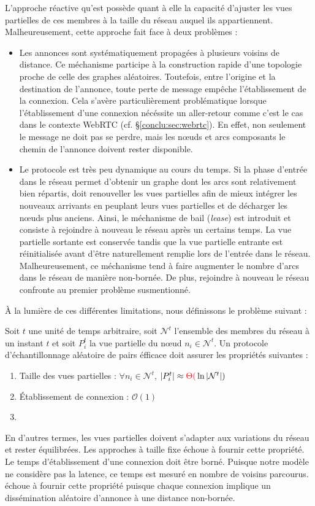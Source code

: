 L'approche réactive qu'est \SCAMP possède quant à elle la capacité d'ajuster les
vues partielles de ces membres à la taille du réseau auquel ils
appartiennent. Malheureusement, cette approche fait face à deux problèmes :
\begin{itemize}
\item Les annonces sont systématiquement propagées à plusieurs voisins de
  distance. Ce méchanisme participe à la construction rapide d'une topologie
  proche de celle des graphes aléatoires. Toutefois, entre l'origine et la
  destination de l'annonce, toute perte de message empêche l'établissement de la
  connexion. Cela s'avère particulièrement problématique lorsque l'établissement
  d'une connexion nécéssite un aller-retour comme c'est le cas dans le contexte
  WebRTC (cf. §\ref{conclu:sec:webrtc}). En effet, non seulement le message ne
  doit pas se perdre, mais les nœuds et arcs composants le chemin de l'annonce
  doivent rester disponible.
\item Le protocole est très peu dynamique au cours du temps. Si la phase
  d'entrée dans le réseau permet d'obtenir un graphe dont les arcs sont
  relativement bien répartis, \SCAMP doit renouveller les vues partielles afin
  de mieux intégrer les nouveaux arrivants en peuplant leurs vues partielles et
  de décharger les nœuds plus anciens. Ainsi, le méchanisme de bail
  (\emph{lease}) est introduit et consiste à rejoindre à nouveau le réseau après
  un certains temps. La vue partielle sortante est conservée tandis que la vue
  partielle entrante est réinitialisée avant d'être naturellement remplie lors
  de l'entrée dans le réseau. Malheureusement, ce méchanisme tend à faire
  augmenter le nombre d'arcs dans le réseau de manière non-bornée. De plus,
  rejoindre à nouveau le réseau confronte au premier problème susmentionné.
\end{itemize}
À la lumière de ces différentes limitations, nous définissons le problème
suivant :

\begin{problem}
  Soit $t$ une unité de temps arbitraire, soit $\mathcal{N}^t$ l'ensemble des
  membres du réseau à un instant $t$ et soit $P_i^t$ la vue partielle du nœud
  $n_i \in \mathcal{N}^t$. Un protocole d'échantillonnage aléatoire de pairs
  éfficace doit assurer les propriétés suivantes :
  \begin{enumerate}
  \item Taille des vues partielles : \hfill $\forall n_i \in \mathcal{N}^t$,
    $|P_i^t| \approx \textcolor{red}{\Theta(} \ln |\mathcal{N}^t|)$
  \item Établissement de connexion : \hfill $\mathcal{O}(1)$
  \item {}
  \end{enumerate}
\end{problem}
En d'autres termes, les vues partielles doivent s'adapter aux variations du
réseau et rester équilibrées. Les approches à taille fixe échoue à fournir cette
propriété. Le temps d'établissement d'une connexion doit être borné. Puisque
notre modèle ne considère pas la latence, ce temps est mesuré en nombre de
voisins parcourus. \SCAMP échoue à fournir cette propriété puisque chaque
connexion implique un dissémination aléatoire d'annonce à une distance
non-bornée. 

